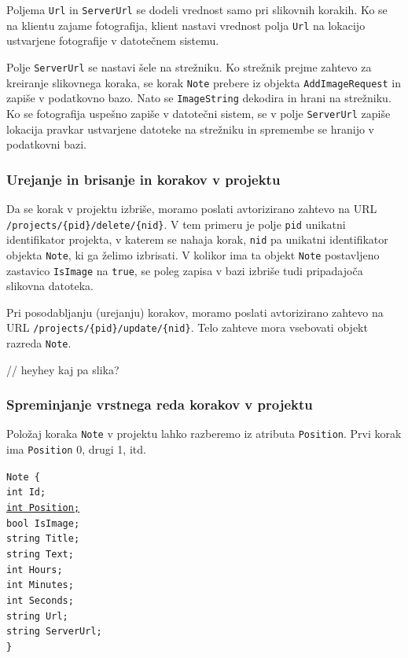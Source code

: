 \documentclass[a4paper, 12pt]{book}
\begin{document}
Poljema \texttt{Url} in \texttt{ServerUrl} se dodeli vrednost samo pri slikovnih korakih.
Ko se na klientu zajame fotografija, klient nastavi vrednost polja \texttt{Url} na lokacijo ustvarjene fotografije v datotečnem sistemu.

Polje \texttt{ServerUrl} se nastavi šele na strežniku.
Ko strežnik prejme zahtevo za kreiranje slikovnega koraka, se korak \texttt{Note} prebere iz objekta \texttt{AddImageRequest} in zapiše v podatkovno bazo.
Nato se \texttt{ImageString} dekodira in hrani na strežniku.
Ko se fotografija uspešno zapiše v datotečni sistem, se v polje \texttt{ServerUrl} zapiše lokacija pravkar ustvarjene datoteke na strežniku in spremembe se hranijo v podatkovni bazi.

\subsubsection{Urejanje in brisanje in korakov v projektu}

Da se korak v projektu izbriše, moramo poslati avtorizirano zahtevo na URL \texttt{/projects/\{pid\}/delete/\{nid\}}.
V tem primeru je polje \texttt{pid} unikatni identifikator projekta, v katerem se nahaja korak, \texttt{nid} pa unikatni identifikator objekta \texttt{Note}, ki ga želimo izbrisati.
V kolikor ima ta objekt \texttt{Note} postavljeno zastavico \texttt{IsImage} na \texttt{true}, se poleg zapisa v bazi izbriše tudi pripadajoča slikovna datoteka.

Pri posodabljanju (urejanju) korakov, moramo poslati avtorizirano zahtevo na URL \texttt{/projects/\{pid\}/update/\{nid\}}.
Telo zahteve mora vsebovati objekt razreda \texttt{Note}.

// heyhey kaj pa slika?

\subsubsection{Spreminjanje vrstnega reda korakov v projektu}

Položaj koraka \texttt{Note} v projektu lahko razberemo iz atributa \texttt{Position}.
Prvi korak ima \texttt{Position} 0, drugi 1, itd.

\noindent \texttt{Note \{ \\
int Id; \\
\underline{int Position;} \\
bool IsImage;  \\
string Title; \\
string Text; \\
int Hours; \\
int Minutes; \\
int Seconds; \\
string Url; \\
string ServerUrl; \\
\}
}
\end{document}

